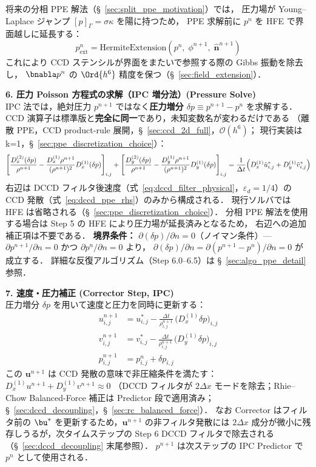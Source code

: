 将来の分相 PPE 解法（§~\ref{sec:split_ppe_motivation}）では，
圧力場が Young--Laplace ジャンプ $[p]_\Gamma = \sigma\kappa$ を陽に持つため，
PPE 求解前に $p^n$ を HFE で界面越しに延長する：
\[
  p^n_{\mathrm{ext}} = \text{HermiteExtension}(p^n,\; \phi^{n+1},\; \hat{\bm{n}}^{n+1})
\]
これにより CCD ステンシルが界面をまたいで参照する際の Gibbs 振動を除去し，
$\bnabla p^n$ の $\Ord{h^6}$ 精度を保つ（§~\ref{sec:field_extension}）．

\textbf{6. 圧力 Poisson 方程式の求解（IPC 増分法）(Pressure Solve)} \\
IPC 法では，絶対圧力 $p^{n+1}$ ではなく\textbf{圧力増分 $\delta p \equiv p^{n+1} - p^n$} を求解する．
CCD 演算子は標準版と\textbf{完全に同一}であり，未知変数名が変わるだけである
（離散 PPE，CCD product-rule 展開，§~\ref{sec:ccd_2d_full}，$\mathcal{O}(h^6)$；
現行実装は k=1，§~\ref{sec:ppe_discretization_choice}）：
\begin{equation}
  \left[\frac{D_x^{(2)}(\delta p)}{\rho^{n+1}}
  - \frac{D_x^{(1)}\rho^{n+1}}{(\rho^{n+1})^2}D_x^{(1)}(\delta p)\right]_{i,j}
  + \left[\frac{D_y^{(2)}(\delta p)}{\rho^{n+1}}
  - \frac{D_y^{(1)}\rho^{n+1}}{(\rho^{n+1})^2}D_y^{(1)}(\delta p)\right]_{i,j}
  = \frac{1}{\Delta t}\Bigl(D_x^{(1)}\tilde{u}^*_{i,j} + D_y^{(1)}\tilde{v}^*_{i,j}\Bigr)
  \label{eq:PPE_CCD_fullalgo}
\end{equation}
右辺は DCCD フィルタ後速度（式~\eqref{eq:dccd_filter_physical}，$\varepsilon_d=1/4$）の
CCD 発散（式~\eqref{eq:dccd_ppe_rhs}）のみから構成される．
現行ソルバでは HFE は省略される（§~\ref{sec:ppe_discretization_choice}）．
分相 PPE 解法を使用する場合は Step 5 の HFE により圧力場が延長済みとなるため，
右辺への追加補正項は不要である．
\textbf{境界条件：} $\partial(\delta p)/\partial n = 0$（ノイマン条件）—
$\partial p^{n+1}/\partial n = 0$ かつ $\partial p^n/\partial n = 0$ より，
$\partial(\delta p)/\partial n = \partial(p^{n+1}-p^n)/\partial n = 0$ が成立する．
詳細な反復アルゴリズム（Step 6.0--6.5）は §~\ref{sec:algo_ppe_detail} 参照．

\textbf{7. 速度・圧力補正 (Corrector Step, IPC)} \\
圧力増分 $\delta p$ を用いて速度と圧力を同時に更新する：
\begin{align*}
u^{n+1}_{i,j} &= u^*_{i,j}
  - \frac{\Delta t}{\rho^{n+1}_{i,j}}\,\bigl(D_x^{(1)} \delta p\bigr)_{i,j} \\
v^{n+1}_{i,j} &= v^*_{i,j}
  - \frac{\Delta t}{\rho^{n+1}_{i,j}}\,\bigl(D_y^{(1)} \delta p\bigr)_{i,j} \\
p^{n+1}_{i,j} &= p^n_{i,j} + \delta p_{i,j}
\end{align*}
この $\bm{u}^{n+1}$ は CCD 発散の意味で非圧縮条件を満たす：
$D_x^{(1)} u^{n+1} + D_y^{(1)} v^{n+1} \approx 0$
（DCCD フィルタが $2\Delta x$ モードを除去；Rhie--Chow Balanced-Force 補正は Predictor 段で適用済み；§~\ref{sec:dccd_decoupling}，§~\ref{sec:rc_balanced_force}）．
なお Corrector はフィルタ前の $\bu^*$ を更新するため，$\bm{u}^{n+1}$ の非フィルタ発散には
$2\Delta x$ 成分が微小に残存しうるが，次タイムステップの Step 6 DCCD フィルタで除去される
（§~\ref{sec:dccd_decoupling} 末尾参照）．
$p^{n+1}$ は次ステップの IPC Predictor で $p^n$ として使用される．

